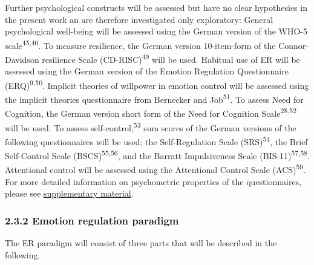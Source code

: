 \documentclass[
  english,
  man,floatsintext]{apa6}
\begin{document}
Further psychological constructs will be assessed but have no clear hypothesies in the present work an are therefore investigated only exploratory:
General psychological well-being will be assessed using the German version of the WHO-5 scale\textsuperscript{45,46}.
To measure resilience, the German version 10-item-form of the Connor-Davidson resilience Scale (CD-RISC)\textsuperscript{49} will be used.
Habitual use of ER will be assessed using the German version of the Emotion Regulation Questionnaire (ERQ)\textsuperscript{9,50}.
Implicit theories of willpower in emotion control will be assessed using the implicit theories questionnaire from Bernecker and Job\textsuperscript{51}.
To assess Need for Cognition, the German version short form of the Need for Cognition Scale\textsuperscript{28,52} will be used.
To assess self-control,\textsuperscript{53} sum scores of the German versions of the following questionnaires will be used: the Self-Regulation Scale (SRS)\textsuperscript{54}, the Brief Self-Control Scale (BSCS)\textsuperscript{55,56}, and the Barratt Impulsiveness Scale (BIS-11)\textsuperscript{57,58}.
Attentional control will be assessed using the Attentional Control Scale (ACS)\textsuperscript{59}.
For more detailed information on psychometric properties of the questionnaires, please see \protect\hyperlink{SupplementQuestionnaires}{supplementary material}.

\hypertarget{emotion-regulation-paradigm}{%
\subsubsection{2.3.2 Emotion regulation paradigm}\label{emotion-regulation-paradigm}}

The ER paradigm will consist of three parts that will be described in the following.
\end{document}
